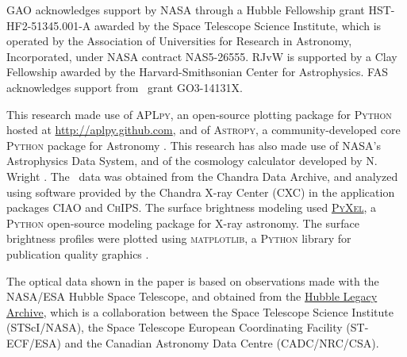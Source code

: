GAO acknowledges support by NASA through a Hubble Fellowship grant HST-HF2-51345.001-A awarded by the Space Telescope Science Institute, which is operated by the Association of Universities for Research in Astronomy, Incorporated, under NASA contract NAS5-26555. RJvW is supported by a Clay Fellowship awarded by the Harvard-Smithsonian Center for Astrophysics. FAS acknowledges support from \chandra\ grant GO3-14131X.

This research made use of \textsc{APLpy}, an open-source plotting package for \textsc{Python} hosted at \url{http://aplpy.github.com}, and of \textsc{Astropy}, a community-developed core \textsc{Python} package
  for Astronomy \citep{astropy}. This research has also made use of NASA's Astrophysics Data System, and of the cosmology calculator developed by N. Wright \citep{Wright2006}. The \chandra\ data was obtained from the Chandra Data Archive, and analyzed using software provided by the Chandra X-ray Center (CXC) in the application packages \textsc{CIAO} and \textsc{ChIPS}. The surface brightness modeling used \href{https://github.com/gogrean/PyXel}{\textsc{PyXel}}, a \textsc{Python} open-source modeling package for X-ray astronomy. The surface brightness profiles were plotted using \textsc{matplotlib}, a \textsc{Python} library for publication quality graphics \citep{Hunter2007}.
  
 The optical data shown in the paper is based on observations made with the NASA/ESA Hubble Space Telescope, and obtained from the \href{http://hla.stsci.edu/}{Hubble Legacy Archive}, which is a collaboration between the Space Telescope Science Institute (STScI/NASA), the Space Telescope European Coordinating Facility (ST-ECF/ESA) and the Canadian Astronomy Data Centre (CADC/NRC/CSA).

